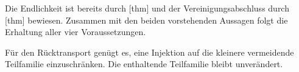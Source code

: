\documentclass[main.tex]{subfiles}
\begin{document}
Die Endlichkeit ist bereits durch
[thm] und der
Vereinigungsabschluss durch
[thm] bewiesen. Zusammen
mit den beiden vorstehenden Aussagen folgt die Erhaltung aller vier
Voraussetzungen.

\begin{tabproof}
\end{tabproof}

Für den Rücktransport genügt es, eine Injektion auf die kleinere
vermeidende Teilfamilie einzuschränken. Die enthaltende Teilfamilie bleibt
unverändert.
\end{document}
